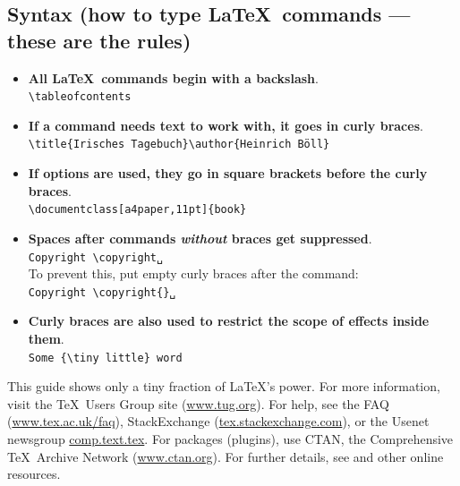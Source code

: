 \documentclass[a5paper]{veryshortguide}
\begin{document}
\subsection*{Syntax (how to type \LaTeX\ commands --- these are the rules)}

\begin{itemize}[noitemsep]
  \item \textbf{All \LaTeX\ commands begin with a backslash}.\\
    \example \verb+\tableofcontents+\endexample
  \item \textbf{If a command needs text to work
    with, it goes in curly braces}.\\
    \example \verb+\title{Irisches Tagebuch}\author{Heinrich Böll}+\endexample
  \item \textbf{If options are used, they go in square brackets
  before the curly braces}.\\
    \example \verb+\documentclass[a4paper,11pt]{book}+\endexample
  \item \textbf{Spaces after commands \emph{without} braces get suppressed}.\\
    \example \verb+Copyright \copyright␣+\texttt{\number\year}
     \nobox\\
    To prevent this, put empty curly braces after the command:\\
    \example \verb+Copyright \copyright{}␣+\texttt{\number\year}
     \yesbox
  \item \textbf{Curly braces are also used to restrict the scope of
    effects inside them}.\\
    \example \verb+Some {\tiny little} word+ 
\end{itemize}
\begin{note}
This guide shows only a tiny fraction of \LaTeX's power. For more
information, visit the \TeX\ Users Group site (\url{www.tug.org}). For
help, see the FAQ (\url{www.tex.ac.uk/faq}), StackExchange
(\url{tex.stackexchange.com}), or the Usenet newsgroup
\url{comp.text.tex}. For packages (plugins), use CTAN, the
Comprehensive \TeX\ Archive Network (\url{www.ctan.org}). For
further details, see 
\parencite{fi} and other online resources.
\end{note}
\end{document}
